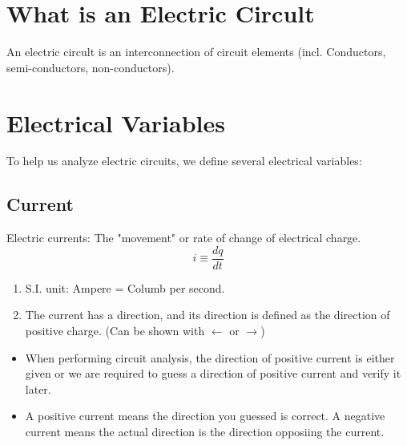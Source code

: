 \documentclass{article}
\begin{document}
\tableofcontents
\section{What is an Electric Circult}
\begin{definition}
    An electric circult is an interconnection of circuit elements (incl. Conductors, semi-conductors, non-conductors). 
\end{definition}

\section{Electrical Variables}
    To help us analyze electric circuits, we define several electrical variables:
    \subsection{Current}
    \begin{definition}
        Electric currents: The "movement" or rate of change of electrical charge. 
        \begin{equation}
            i\equiv\frac{dq}{dt}
        \end{equation} 
        
        \begin{enumerate}
            \item S.I. unit: Ampere = Columb per second.
            \item The current has a direction, and its direction is defined as the direction of positive charge. (Can be shown with $\leftarrow$ or $\rightarrow$)
        \end{enumerate}
    \end{definition}
    \begin{itemize}
        \item When performing circuit analysis, the direction of positive current is either given or we are required to guess a direction of positive current and verify it later. 
        \item A positive current means the direction you guessed is correct. A negative current means the actual direction is the direction opposiing the current.
    \end{itemize}
\end{document}
